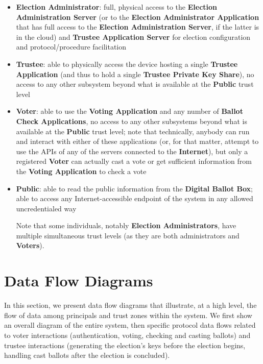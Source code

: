 \documentclass[10pt,letterpaper]{article}
\begin{document}
\begin{itemize}

    \item \textbf{Election Administrator}: full, physical access to the \textbf{Election Administration Server} (or to the \textbf{Election Administrator Application} that has full access to the \textbf{Election Administration Server}, if the latter is in the cloud) and \textbf{Trustee Application Server} for election configuration and protocol/procedure facilitation

    \item \textbf{Trustee}: able to physically access the device hosting a single \textbf{Trustee Application} (and thus to hold a single \textbf{Trustee Private Key Share}), no access to any other subsystem beyond what is available at the \textbf{Public} trust level

    \item \textbf{Voter}: able to use the \textbf{Voting Application} and any number of \textbf{Ballot Check Applications}, no access to any other subsystems beyond what is available at the \textbf{Public} trust level; note that technically, anybody can run and interact with either of these applications (or, for that matter, attempt to use the APIs of any of the servers connected to the \textbf{Internet}), but only a registered \textbf{Voter} can actually cast a vote or get sufficient information from the \textbf{Voting Application} to check a vote

    \item \textbf{Public}: able to read the public information from the \textbf{Digital Ballot Box}; able to access any Internet-accessible endpoint of the system in any allowed uncredentialed way

Note that some individuals, notably \textbf{Election Administrators}, have multiple simultaneous trust levels (as they are both administrators and \textbf{Voters}).

\end{itemize}

\pagebreak
\section{Data Flow Diagrams}

In this section, we present data flow diagrams that illustrate, at a high level, the flow of data among principals and trust zones within the system. We first show an overall diagram of the entire system, then specific protocol data flows related to voter interactions (authentication, voting, checking and casting ballots) and trustee interactions (generating the election's keys before the election begins, handling cast ballots after the election is concluded).
\end{document}
